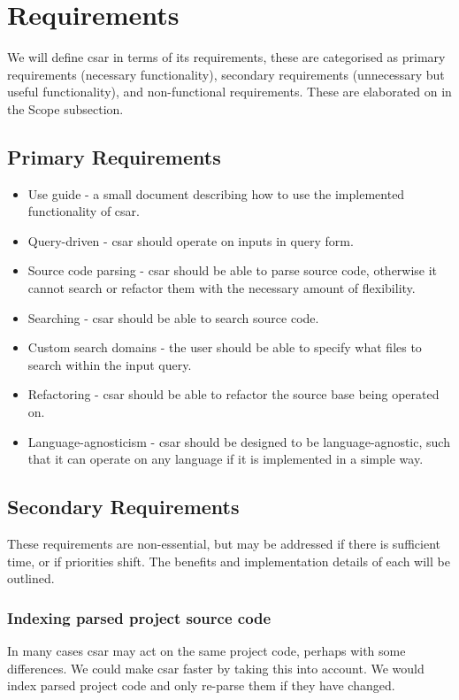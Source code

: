 \documentclass[12pt, letterpaper]{article}
\begin{document}
\section{Requirements}
We will define csar in terms of its requirements, these are categorised as primary requirements (necessary functionality), secondary requirements (unnecessary but useful functionality), and non-functional requirements.
These are elaborated on in the Scope subsection.

\subsection{Primary Requirements}
\begin{itemize}
  \item Use guide - a small document describing how to use the implemented functionality of csar.
  \item Query-driven - csar should operate on inputs in query form.
  \item Source code parsing - csar should be able to parse source code, otherwise it cannot search or refactor them with the necessary amount of flexibility.
  \item Searching - csar should be able to search source code.
  \item Custom search domains - the user should be able to specify what files to search within the input query.
  \item Refactoring - csar should be able to refactor the source base being operated on.
  \item Language-agnosticism - csar should be designed to be language-agnostic, such that it can operate on any language if it is implemented in a simple way.
\end{itemize}

\subsection{Secondary Requirements}
These requirements are non-essential, but may be addressed if there is sufficient time, or if priorities shift.
The benefits and implementation details of each will be outlined.

\subsubsection{Indexing parsed project source code}
In many cases csar may act on the same project code, perhaps with some differences.
We could make csar faster by taking this into account.
We would index parsed project code and only re-parse them if they have changed.
\end{document}
